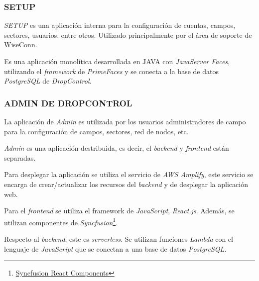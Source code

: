 \subsubsection{SETUP}

\textit{SETUP} es una aplicación interna para la configuración de cuentas, campos, sectores, usuarios, entre otros. Utilizado principalmente por el área de soporte de WiseConn.

Es una aplicación monolítica desarrollada en JAVA con \textit{JavaServer Faces}, utilizando el \textit{framework} de \textit{PrimeFaces} y se conecta a la base de datos \textit{PostgreSQL} de \textit{DropControl}.

\subsubsection{ADMIN DE DROPCONTROL}

La aplicación de \textit{Admin} es utilizada por los usuarios administradores de campo para la configuración de campos, sectores, red de nodos, etc.

\textit{Admin} es una aplicación destribuida, es decir, el \textit{backend} y \textit{frontend} están separadas.

Para desplegar la aplicación se utiliza el servicio de \textit{AWS Amplify}, este servicio se encarga de crear/actualizar los recursos del \textit{backend} y de desplegar la aplicación web.

Para el \textit{frontend} se utiliza el framework de \textit{JavaScript}, \textit{React.js}. Además, se utilizan componentes de \textit{Syncfusion}\footnote{\href{https://www.syncfusion.com/react-components}{Syncfusion React Components}}.

Respecto al \textit{backend}, este es \textit{serverless}. Se utilizan funciones \textit{Lambda} con el lenguaje de \textit{JavaScript} que se conectan a una base de datos \textit{PostgreSQL}.
\fi